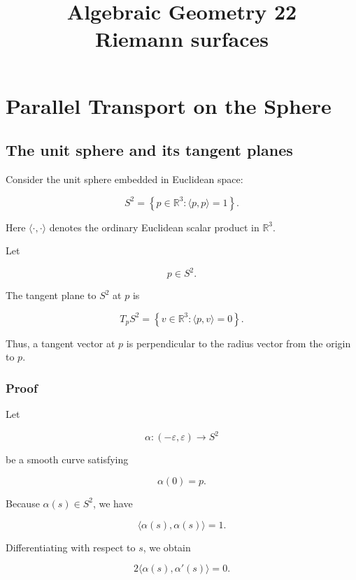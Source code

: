 \documentclass[12pt,a4paper]{article}
\theoremstyle{notespace}
\begin{document}
\title{Algebraic Geometry 22\\
	\large Riemann surfaces}
\author{}
\date{}

	\maketitle
	

	\setcounter{section}{0}

\tableofcontents

	\clearpage

\section{Parallel Transport on the Sphere}

\subsection{The unit sphere and its tangent planes}

Consider the unit sphere embedded in Euclidean space:

\[
S^2
=
\left\{
p\in\mathbb{R}^3:
\langle p,p\rangle=1
\right\}.
\]

Here \(\langle\cdot,\cdot\rangle\) denotes the ordinary Euclidean scalar
product in \(\mathbb{R}^3\).

Let

\[
p\in S^2.
\]

The tangent plane to \(S^2\) at \(p\) is

\[
\boxed{
	T_pS^2
	=
	\left\{
	v\in\mathbb{R}^3:
	\langle p,v\rangle=0
	\right\}.
}
\]

Thus, a tangent vector at \(p\) is perpendicular to the radius vector
from the origin to \(p\).

\subsubsection{Proof}

Let

\[
\alpha:(-\varepsilon,\varepsilon)\longrightarrow S^2
\]

be a smooth curve satisfying

\[
\alpha(0)=p.
\]

Because \(\alpha(s)\in S^2\), we have

\[
\langle\alpha(s),\alpha(s)\rangle=1.
\]

Differentiating with respect to \(s\), we obtain

\[
2\langle\alpha(s),\alpha'(s)\rangle=0.
\]
\end{document}
